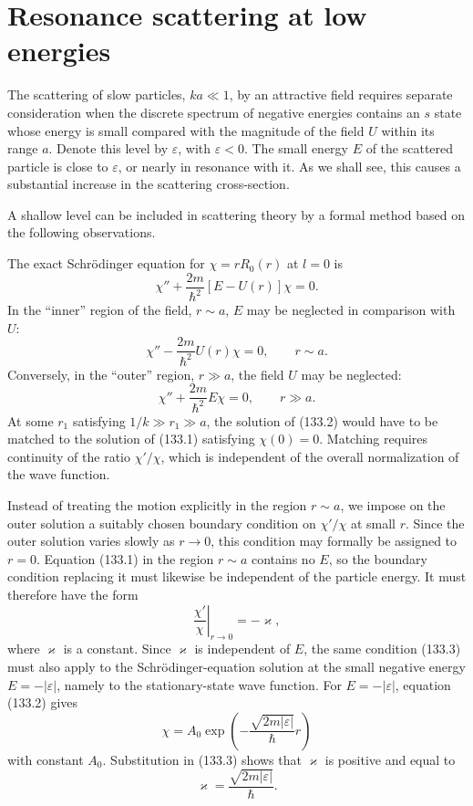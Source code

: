 \section{Resonance scattering at low energies}

The scattering of slow particles, $ka\ll1$, by an attractive field requires separate consideration when the discrete spectrum of negative energies contains an $s$ state whose energy is small compared with the magnitude of the field $U$ within its range $a$. Denote this level by $\varepsilon$, with $\varepsilon<0$. The small energy $E$ of the scattered particle is close to $\varepsilon$, or nearly in resonance with it. As we shall see, this causes a substantial increase in the scattering cross-section.

A shallow level can be included in scattering theory by a formal method based on the following observations.

The exact Schrödinger equation for $\chi=rR_0(r)$ at $l=0$ is
\[
 \chi''+\frac{2m}{\hbar^2}[E-U(r)]\chi=0.
\]
In the ``inner'' region of the field, $r\sim a$, $E$ may be neglected in comparison with $U$:
\begin{equation}
 \chi''-\frac{2m}{\hbar^2}U(r)\chi=0,\qquad r\sim a.
 \tag{133.1}
\end{equation}
Conversely, in the ``outer'' region, $r\gg a$, the field $U$ may be neglected:
\begin{equation}
 \chi''+\frac{2m}{\hbar^2}E\chi=0,\qquad r\gg a.
 \tag{133.2}
\end{equation}
At some $r_1$ satisfying $1/k\gg r_1\gg a$, the solution of (133.2) would have to be matched to the solution of (133.1) satisfying $\chi(0)=0$. Matching requires continuity of the ratio $\chi'/\chi$, which is independent of the overall normalization of the wave function.

Instead of treating the motion explicitly in the region $r\sim a$, we impose on the outer solution a suitably chosen boundary condition on $\chi'/\chi$ at small $r$. Since the outer solution varies slowly as $r\to0$, this condition may formally be assigned to $r=0$. Equation (133.1) in the region $r\sim a$ contains no $E$, so the boundary condition replacing it must likewise be independent of the particle energy. It must therefore have the form
\begin{equation}
 \left.\frac{\chi'}\chi\right|_{r\to0}=-\varkappa,
 \tag{133.3}
\end{equation}
where $\varkappa$ is a constant. Since $\varkappa$ is independent of $E$, the same condition (133.3) must also apply to the Schrödinger-equation solution at the small negative energy $E=-|\varepsilon|$, namely to the stationary-state wave function. For $E=-|\varepsilon|$, equation (133.2) gives
\begin{equation}
 \chi=A_0\exp\left(-\frac{\sqrt{2m|\varepsilon|}}\hbar r\right)
 \tag{133.4}
\end{equation}
with constant $A_0$. Substitution in (133.3) shows that $\varkappa$ is positive and equal to
\begin{equation}
 \varkappa=\frac{\sqrt{2m|\varepsilon|}}\hbar.
 \tag{133.5}
\end{equation}

